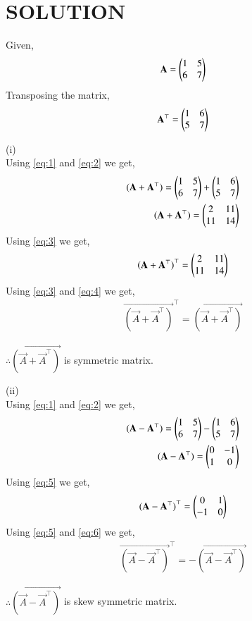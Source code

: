 \documentclass[journal,12pt,twocolumn]{IEEEtran}
\begin{document}
\section*{SOLUTION}
\begin{enumerate}
Given,
\begin{align}
\label{eq:1}
    \Vec{A}=\myvec{1 & 5\\6 & 7}
\end{align}
Transposing the matrix,
\begin{align}
    \label{eq:2}
    \Vec{A}^\top=\myvec{1 & 6 \\5 & 7}
\end{align}
\end{enumerate}
\begin{enumerate}
(i)\\
Using \eqref{eq:1} and \eqref{eq:2} we get,
\begin{align}
\mathbf{(\mathbf{A}+\mathbf{A}^\top)}=\begin{pmatrix}1 & 5\\6 & 7\end{pmatrix}+\begin{pmatrix}1 & 6 \\5 & 7\end{pmatrix}\\
\label{eq:3}
\mathbf{(\mathbf{A}+\mathbf{A}^\top)}=\begin{pmatrix}2 & 11\\11 & 14\end{pmatrix}
\end{align}
Using \eqref{eq:3} we get,
\begin{align}
\label{eq:4}
\mathbf{(\mathbf{A}+\mathbf{A}^\top)}^\top=\begin{pmatrix}2 & 11\\11 & 14\end{pmatrix}
\end{align}
Using \eqref{eq:3} and \eqref{eq:4} we get,
\begin{align}
  \vec{(\vec{A}+\vec{A}^\top)}^\top=\vec{(\vec{A}+\vec{A}^\top)}
\end{align}
\begin{center}
    $\therefore \vec{(\vec{A}+\vec{A}^\top)}$ is symmetric matrix. 
\end{center}
\end{enumerate}
\begin{enumerate}
(ii)\\
Using \eqref{eq:1} and \eqref{eq:2} we get,
\begin{align}
\mathbf{(\mathbf{A}-\mathbf{A}^\top)}=\begin{pmatrix}1 & 5\\6 & 7\end{pmatrix}-\begin{pmatrix}1 & 6 \\5 & 7\end{pmatrix}\\
\label{eq:5}
\mathbf{(\mathbf{A}-\mathbf{A}^\top)}=\begin{pmatrix}0 & -1\\1 & 0\end{pmatrix}
\end{align}
Using \eqref{eq:5} we get,
\begin{align}
\label{eq:6}
\mathbf{(\mathbf{A}-\mathbf{A}^\top)}^\top=\begin{pmatrix}0 & 1\\-1 & 0\end{pmatrix}
\end{align}
Using \eqref{eq:5} and \eqref{eq:6} we get,
\begin{align}
 \vec{(\vec{A}-\vec{A}^\top)}^\top=- \vec{(\vec{A}-\vec{A}^\top)}
\end{align}
\begin{center}
    $\therefore \vec{(\vec{A}-\vec{A}^\top)}$ is skew symmetric matrix. 
\end{center}

\end{enumerate}
\end{document}
